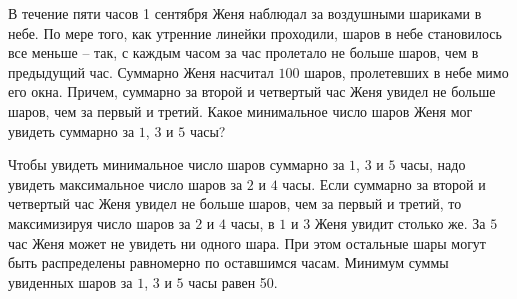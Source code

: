 
В течение пяти часов 1 сентября Женя наблюдал за воздушными шариками в небе. По мере того, как утренние линейки проходили, шаров в небе становилось все меньше -- так, с каждым часом за час пролетало не больше шаров, чем в предыдущий час. Суммарно Женя насчитал $100$ шаров, пролетевших в небе мимо его окна. Причем, суммарно за второй и четвертый час Женя увидел не больше шаров, чем за первый и третий. Какое минимальное число шаров Женя мог увидеть суммарно за $1$, $3$ и $5$ часы?

\solutionSection

Чтобы увидеть минимальное число шаров суммарно за $1$, $3$ и $5$ часы, надо увидеть максимальное число шаров за $2$ и $4$ часы. Если суммарно за второй и четвертый час Женя увидел не больше шаров, чем за первый и третий, то максимизируя число шаров за $2$ и $4$ часы, в $1$ и $3$ Женя увидит столько же. За $5$ час Женя может не увидеть ни одного шара. При этом остальные шары могут быть распределены равномерно по оставшимся часам. Минимум суммы увиденных шаров за $1$, $3$ и $5$ часы равен 50.


